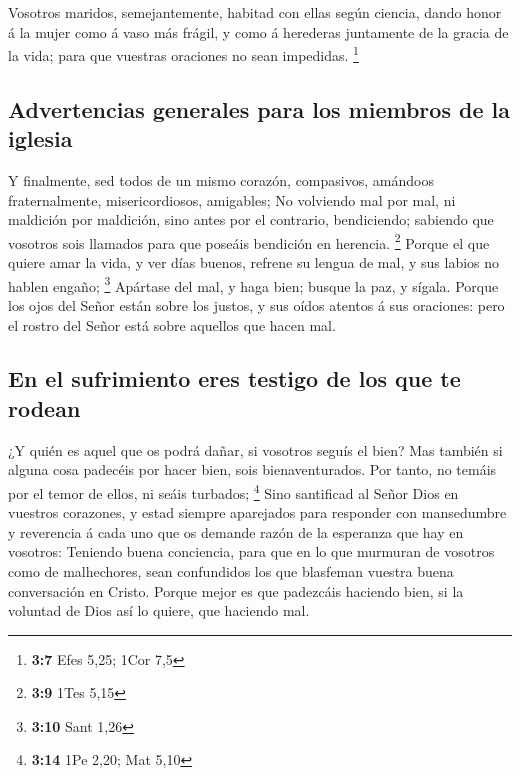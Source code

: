  Vosotros maridos, semejantemente, habitad con ellas según
ciencia, dando honor á la mujer como á vaso más frágil, y como á
herederas juntamente de la gracia de la vida; para que vuestras
oraciones no sean impedidas. \footnote{\textbf{3:7} Efes 5,25; 1Cor 7,5}

\hypertarget{advertencias-generales-para-los-miembros-de-la-iglesia}{%
\subsection{Advertencias generales para los miembros de la
iglesia}\label{advertencias-generales-para-los-miembros-de-la-iglesia}}

 Y finalmente, sed todos de un mismo corazón, compasivos,
amándoos fraternalmente, misericordiosos, amigables;  No
volviendo mal por mal, ni maldición por maldición, sino antes por el
contrario, bendiciendo; sabiendo que vosotros sois llamados para que
poseáis bendición en herencia. \footnote{\textbf{3:9} 1Tes 5,15}
 Porque el que quiere amar la vida, y ver días buenos,
refrene su lengua de mal, y sus labios no hablen engaño; \footnote{\textbf{3:10}
  Sant 1,26}  Apártase del mal, y haga bien; busque la paz,
y sígala.  Porque los ojos del Señor están sobre los
justos, y sus oídos atentos á sus oraciones: pero el rostro del Señor
está sobre aquellos que hacen mal.

\hypertarget{en-el-sufrimiento-eres-testigo-de-los-que-te-rodean}{%
\subsection{En el sufrimiento eres testigo de los que te
rodean}\label{en-el-sufrimiento-eres-testigo-de-los-que-te-rodean}}

 ¿Y quién es aquel que os podrá dañar, si vosotros seguís
el bien?  Mas también si alguna cosa padecéis por hacer
bien, sois bienaventurados. Por tanto, no temáis por el temor de ellos,
ni seáis turbados; \footnote{\textbf{3:14} 1Pe 2,20; Mat 5,10}
 Sino santificad al Señor Dios en vuestros corazones, y
estad siempre aparejados para responder con mansedumbre y reverencia á
cada uno que os demande razón de la esperanza que hay en vosotros:
 Teniendo buena conciencia, para que en lo que murmuran de
vosotros como de malhechores, sean confundidos los que blasfeman vuestra
buena conversación en Cristo.  Porque mejor es que
padezcáis haciendo bien, si la voluntad de Dios así lo quiere, que
haciendo mal.

